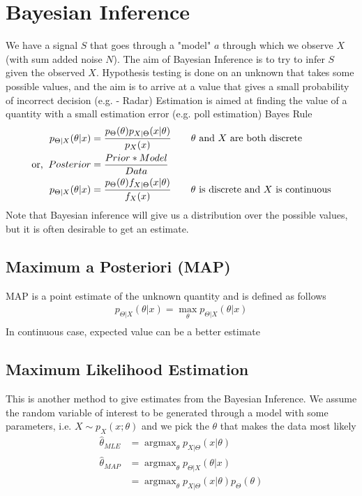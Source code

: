 \documentclass[11pt, a4paper]{article}
\DeclareMathOperator*{\argmax}{argmax}
\begin{document}
    \section{Bayesian Inference}
    We have a signal $S$ that goes through a "model" $a$ through which we observe $X$ (with sum added noise $N$). The aim of Bayesian Inference is to try to infer $S$ given the observed $X$.
    \newline
    Hypothesis testing is done on an unknown that takes some possible values, and the aim is to arrive at a value that gives a small probability of incorrect decision (e.g. - Radar)
    \newline
    Estimation is aimed at finding the value of a quantity with a small estimation error (e.g. poll estimation)
    \newline
    Bayes Rule
    \begin{align*}
        p_{\Theta|X}(\theta|x) &= \frac{p_{\Theta}(\theta)p_{X|\Theta}(x|\theta)}{p_{X}(x)} \tag*{$\theta$ and $X$ are both discrete}\\
        \text{or,\;\;} Posterior &= \frac{Prior * Model}{Data}\\
        p_{\Theta|X}(\theta|x) &= \frac{p_{\Theta}(\theta)f_{X|\Theta}(x|\theta)}{f_{X}(x)} \tag*{$\theta$ is discrete and $X$ is continuous}\\
    \end{align*}
    Note that Bayesian inference will give us a distribution over the possible values, but it is often desirable to get an estimate.

    \subsection{Maximum a Posteriori (MAP)}
    MAP is a point estimate of the unknown quantity and is defined as follows
    \begin{align*}
        p_{\Theta|X}(\theta|x) = \max_{\theta}p_{\Theta|X}(\theta|x) \tag*{$\theta$ with maximum posterior probability}\\
    \end{align*}
    In continuous case, expected value can be a better estimate

    \subsection{Maximum Likelihood Estimation}
    This is another method to give estimates from the Bayesian Inference. We assume the random variable of interest to be generated through a model with some parameters, i.e. $X \sim p_{X}(x;\theta)$ and we pick the $\theta$ that makes the data most likely
    \begin{align*}
        \hat{\theta}_{MLE} &= \argmax_{\theta} p_{X|\Theta}(x|\theta)\\
        \hat{\theta}_{MAP} &= \argmax_{\theta} p_{\Theta|X}(\theta|x)\\
        &= \argmax_{\theta} p_{X|\Theta}(x|\theta)p_{\Theta}(\theta)
    \end{align*}
\end{document}
